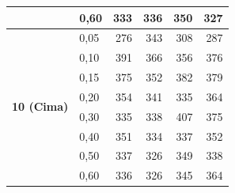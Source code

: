 \begin{table}
\begin{tabular}{clrrrr}
                                                          & 0,60                                                            & 333                        & 336                        & 350                        & 327                         \\ 
    \hline
    \multirow{8}{*}{\textbf{10 (Cima)}}                   & 0,05                                                            & 276                        & 343                        & 308                        & 287                         \\
                                                          & 0,10                                                            & 391                        & 366                        & 356                        & 376                         \\
                                                          & 0,15                                                            & 375                        & 352                        & 382                        & 379                         \\
                                                          & 0,20                                                            & 354                        & 341                        & 335                        & 364                         \\
                                                          & 0,30                                                            & 335                        & 338                        & 407                        & 375                         \\
                                                          & 0,40                                                            & 351                        & 334                        & 337                        & 352                         \\
                                                          & 0,50                                                            & 337                        & 326                        & 349                        & 338                         \\
                                                          & 0,60                                                            & 336                        & 326                        & 345                        & 364                         \\
    \bottomrule
    \end{tabular}
    \end{table}
